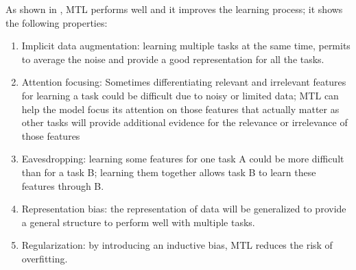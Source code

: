 As shown in \cite{MTLoverview}, MTL performs well and it improves the learning process; it shows the following properties:
\begin{enumerate}
\item Implicit data augmentation: learning multiple tasks at the same time, permits to average the noise and provide a good representation for all the tasks.
\item Attention focusing: Sometimes differentiating relevant and irrelevant features for learning a task could be difficult due to noisy or limited data; MTL can help the model focus its attention on those features that actually matter as other tasks will provide additional evidence for the relevance or irrelevance of those features
\item Eavesdropping: learning some features for one task A could be more difficult than for a task B; learning them together allows task B to learn these features through B.
\item Representation bias: the representation of data will be generalized to provide a general structure to perform well with multiple tasks.
\item Regularization: by introducing an inductive bias, MTL reduces the risk of overfitting.
\end{enumerate}



